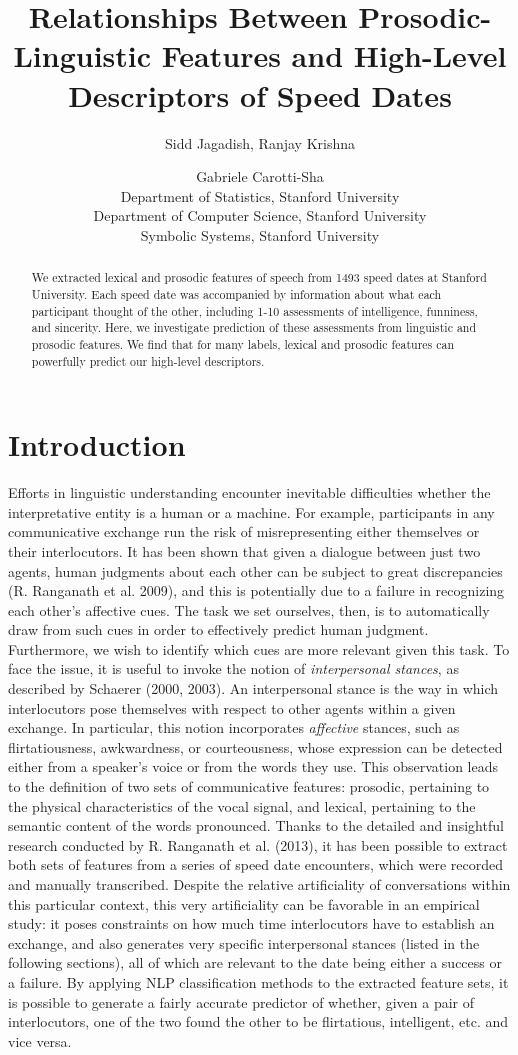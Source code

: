 \documentclass[11pt]{article}
\title{Relationships Between Prosodic-Linguistic Features and High-Level Descriptors of Speed Dates}
\author{Sidd Jagadish,  Ranjay Krishna\and Gabriele Carotti-Sha\\
Department of Statistics, Stanford University\\
Department of Computer Science, Stanford University \\
Symbolic Systems, Stanford University
}
\begin{document}
\maketitle

\begin{abstract}
We extracted lexical and prosodic features of speech from 1493 speed dates at Stanford University.  Each speed date was accompanied by information about what each participant thought of the other, including 1-10 assessments of intelligence, funniness, and sincerity.  Here, we investigate prediction of these assessments from linguistic and prosodic features.  We find that for many labels, lexical and prosodic features can powerfully predict our high-level descriptors.
\end{abstract}

\section{Introduction}
Efforts in linguistic understanding encounter inevitable difficulties whether the interpretative entity is a human or a machine. For example, participants in any communicative exchange run the risk of misrepresenting either themselves or their interlocutors. It has been shown that given a dialogue between just two agents, human judgments about each other can be subject to great discrepancies (R. Ranganath et al. 2009), and this is potentially due to a failure in recognizing each other's affective cues. The task we set ourselves, then, is to automatically draw from such cues in order to effectively predict human judgment. Furthermore, we wish to identify which cues are more relevant given this task. 
To face the issue, it is useful to invoke the notion of \textit{interpersonal stances}, as described by Schaerer (2000, 2003). An interpersonal stance is the way in which interlocutors pose themselves with respect to other agents within a given exchange. In particular, this notion incorporates \textit{affective} stances, such as flirtatiousness, awkwardness, or courteousness, whose expression can be detected either from a speaker's voice or from the words they use. This observation leads to the definition of two sets of communicative features: prosodic, pertaining to the physical characteristics of the vocal signal, and lexical, pertaining to the semantic content of the words pronounced. 
Thanks to the detailed and insightful research conducted by R. Ranganath et al. (2013), it has been possible to extract both sets of features from a series of speed date encounters, which were recorded and manually transcribed. Despite the relative artificiality of conversations within this particular context, this very artificiality can be favorable in an empirical study: it poses constraints on how much time interlocutors have to establish an exchange, and also generates very specific interpersonal stances (listed in the following sections), all of which are relevant to the date being either a success or a failure. By applying NLP classification methods to the extracted feature sets, it is possible to generate a fairly accurate predictor of whether, given a pair of interlocutors, one of the two found the other to be flirtatious, intelligent, etc. and vice versa. 
\end{document}
